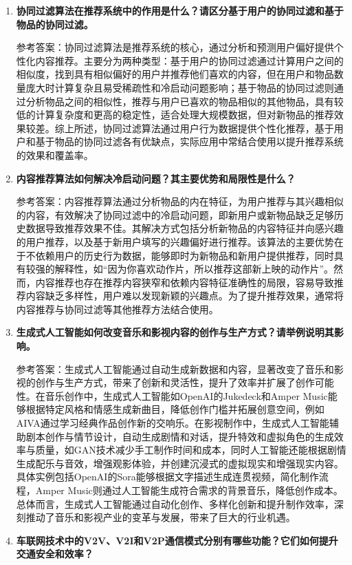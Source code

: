 \begin{enumerate}
\item \textbf{协同过滤算法在推荐系统中的作用是什么？请区分基于用户的协同过滤和基于物品的协同过滤。}

参考答案：协同过滤算法是推荐系统的核心，通过分析和预测用户偏好提供个性化内容推荐。主要分为两种类型：基于用户的协同过滤通过计算用户之间的相似度，找到具有相似偏好的用户并推荐他们喜欢的内容，但在用户和物品数量庞大时计算复杂且易受稀疏性和冷启动问题影响；基于物品的协同过滤则通过分析物品之间的相似性，推荐与用户已喜欢的物品相似的其他物品，具有较低的计算复杂度和更高的稳定性，适合处理大规模数据，但对新物品的推荐效果较差。综上所述，协同过滤算法通过用户行为数据提供个性化推荐，基于用户和基于物品的协同过滤各有优缺点，实际应用中常结合使用以提升推荐系统的效果和覆盖率。

\item  \textbf{内容推荐算法如何解决冷启动问题？其主要优势和局限性是什么？}

参考答案：内容推荐算法通过分析物品的内在特征，为用户推荐与其兴趣相似的内容，有效解决了协同过滤中的冷启动问题，即新用户或新物品缺乏足够历史数据导致推荐效果不佳。其解决方式包括分析新物品的内容特征并向感兴趣的用户推荐，以及基于新用户填写的兴趣偏好进行推荐。该算法的主要优势在于不依赖用户的历史行为数据，能够即时为新物品和新用户提供推荐，同时具有较强的解释性，如“因为你喜欢动作片，所以推荐这部新上映的动作片”。然而，内容推荐也存在推荐内容狭窄和依赖内容特征准确性的局限，容易导致推荐内容缺乏多样性，用户难以发现新颖的兴趣点。为了提升推荐效果，通常将内容推荐与协同过滤等其他推荐方法结合使用。

\item \textbf{生成式人工智能如何改变音乐和影视内容的创作与生产方式？请举例说明其影响。}

参考答案：生成式人工智能通过自动生成新数据和内容，显著改变了音乐和影视的创作与生产方式，带来了创新和灵活性，提升了效率并扩展了创作可能性。在音乐创作中，生成式人工智能如OpenAI的Jukedeck和Amper Music能够根据特定风格和情感生成新曲目，降低创作门槛并拓展创意空间，例如AIVA通过学习经典作品创作新的交响乐。在影视制作中，生成式人工智能辅助剧本创作与情节设计，自动生成剧情和对话，提升特效和虚拟角色的生成效率与质量，如GAN技术减少手工制作时间和成本，同时人工智能还能根据剧情生成配乐与音效，增强观影体验，并创建沉浸式的虚拟现实和增强现实内容。具体实例包括OpenAI的Sora能够根据文字描述生成连贯视频，简化制作流程，Amper Music则通过人工智能生成符合需求的背景音乐，降低创作成本。总体而言，生成式人工智能通过自动化创作、多样化创新和提升制作效率，深刻推动了音乐和影视产业的变革与发展，带来了巨大的行业机遇。

\item \textbf{车联网技术中的V2V、V2I和V2P通信模式分别有哪些功能？它们如何提升交通安全和效率？}


\end{enumerate}

